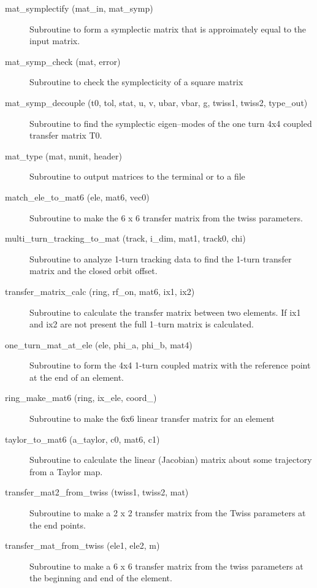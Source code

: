 \begin{description}
\item[mat\_symplectify (mat\_in, mat\_symp)] \Newline
Subroutine to form a symplectic matrix that is approimately equal to the input matrix. 

\item[mat\_symp\_check (mat, error)] \Newline
Subroutine to check the symplecticity of a square matrix 

\item[mat\_symp\_decouple (t0, tol, stat, u, v, ubar, vbar, g, twiss1, twiss2, type\_out)] \Newline
Subroutine to find the symplectic eigen--modes of the one turn 4x4 coupled 
transfer matrix T0. 

\item[mat\_type (mat, nunit, header)] \Newline 
     Subroutine to output matrices to the terminal or to a file

\item[match\_ele\_to\_mat6 (ele, mat6, vec0)] \Newline 
Subroutine to make the 6 x 6 transfer matrix from the twiss parameters.

\item[multi\_turn\_tracking\_to\_mat (track, i\_dim, mat1, track0, chi)] \Newline
Subroutine to analyze 1-turn tracking data to find the 1-turn transfer matrix 
and the closed orbit offset.

\item[transfer\_matrix\_calc (ring, rf\_on, mat6, ix1, ix2)] \Newline
Subroutine to calculate the transfer matrix between two elements. If
ix1 and ix2 are not present the full 1--turn matrix is calculated.

\item[one\_turn\_mat\_at\_ele (ele, phi\_a, phi\_b, mat4)] \Newline
Subroutine to form the 4x4 1-turn coupled matrix with the reference point 
at the end of an element. 

\item[ring\_make\_mat6 (ring, ix\_ele, coord\_)] \Newline
Subroutine to make the 6x6 linear transfer matrix for an element 

\item[taylor\_to\_mat6 (a\_taylor, c0, mat6, c1)] \Newline
Subroutine to calculate the linear (Jacobian) matrix about some trajectory from a Taylor map. 

\item[transfer\_mat2\_from\_twiss (twiss1, twiss2, mat)] \Newline
Subroutine to make a 2 x 2 transfer matrix from the Twiss parameters at the end points. 

\item[transfer\_mat\_from\_twiss (ele1, ele2, m)] \Newline 
Subroutine to make a 6 x 6 transfer matrix from the twiss parameters
at the beginning and end of the element.


\end{description}
